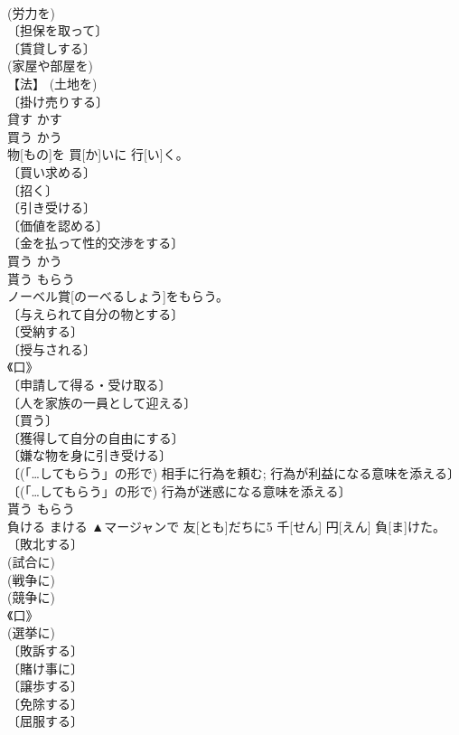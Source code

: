 \documentclass[8pt]{extreport}
\begin{document}
\begin{CJK}{UTF8}{min}
\\	(労力を) 
\\	〔担保を取って〕 
\\	〔賃貸しする〕 
\\	(家屋や部屋を) 
\\	【法】 (土地を) 
\\	〔掛け売りする〕 
\\	貸す	かす	
\\	買う	かう	
\\	物[もの]を 買[か]いに 行[い]く。	
\\	〔買い求める〕 
\\	〔招く〕 
\\	〔引き受ける〕 
\\	〔価値を認める〕 
\\	〔金を払って性的交渉をする〕 
\\	買う	かう	
\\	貰う	もらう	
\\	ノーベル賞[のーべるしょう]をもらう。	
\\	〔与えられて自分の物とする〕 
\\	〔受納する〕 
\\	〔授与される〕 
\\	《口》 
\\	〔申請して得る・受け取る〕 
\\	〔人を家族の一員として迎える〕 
\\	〔買う〕 
\\	〔獲得して自分の自由にする〕 
\\	〔嫌な物を身に引き受ける〕 
\\	〔(「…してもらう」の形で) 相手に行為を頼む; 行為が利益になる意味を添える〕 
\\	〔(「…してもらう」の形で) 行為が迷惑になる意味を添える〕 
\\	貰う	もらう	
\\	負ける	まける	▲マージャンで 友[とも]だちに5 千[せん] 円[えん] 負[ま]けた。	
\\	〔敗北する〕 
\\	(試合に) 
\\	(戦争に) 
\\	(競争に) 
\\	《口》 
\\	(選挙に) 
\\	〔敗訴する〕 
\\	〔賭け事に〕 
\\	〔譲歩する〕 
\\	〔免除する〕 
\\	〔屈服する〕 

\end{CJK}
\end{document}
